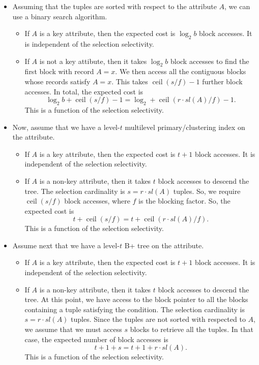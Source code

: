 \documentclass[a4paper, openany]{memoir}
\theoremstyle{definition}
\theoremstyle{plain}
\begin{document}
\begin{itemize}
    \item Assuming that the tuples are sorted with respect to the attribute $A$, we can use a binary search algorithm. 
    \begin{itemize}
        \item If $A$ is a key attribute, then the expected cost is $\log_2 b$ block accesses. It is independent of the selection selectivity.
        \item If $A$ is not a key attibute, then it takes $\log_2 b$ block accesses to find the first block with record $A = x$. We then access all the contiguous blocks whose records satisfy $A = x$. This takes $\operatorname{ceil}(s/f) - 1$ further block accesses. In total, the expected cost is
        \[\log_2 b + \operatorname{ceil}(s/f) - 1 = \log_2 + \operatorname{ceil}(r \cdot \textit{sl}(A)/f) - 1.\]
        This is a function of the selection selectivity.
    \end{itemize}

    \item Now, assume that we have a level-$t$ multilevel primary/clustering index on the attribute.
    \begin{itemize}
        \item If $A$ is a key attribute, then the expected cost is $t + 1$ block accesses. It is independent of the selection selectivity.
        \item If $A$ is a non-key attribute, then it takes $t$ block accesses to descend the tree. The selection cardinality is $s = r \cdot \textit{sl}(A)$ tuples. So, we require $\operatorname{ceil}(s/f)$ block accesses, where $f$ is the blocking factor. So, the expected cost is
        \[t + \operatorname{ceil}(s/f) = t + \operatorname{ceil}(r \cdot \textit{sl}(A)/f).\]
        This is a function of the selection selectivity.
    \end{itemize}

    \item Assume next that we have a level-$t$ B+ tree on the attribute.
    \begin{itemize}
        \item If $A$ is a key attribute, then the expected cost is $t + 1$ block accesses. It is independent of the selection selectivity.
        \item If $A$ is a non-key attribute, then it takes $t$ block accesses to descend the tree. At this point, we have access to the block pointer to all the blocks containing a tuple satisfying the condition. The selection cardinality is $s = r \cdot \textit{sl}(A)$ tuples. Since the tuples are not sorted with respected to $A$, we assume that we must access $s$ blocks to retrieve all the tuples. In that case, the expected number of block accesses is
        \[t + 1 + s = t + 1 + r \cdot \textit{sl}(A).\]
        This is a function of the selection selectivity.
    \end{itemize}


\end{itemize}
\end{document}
